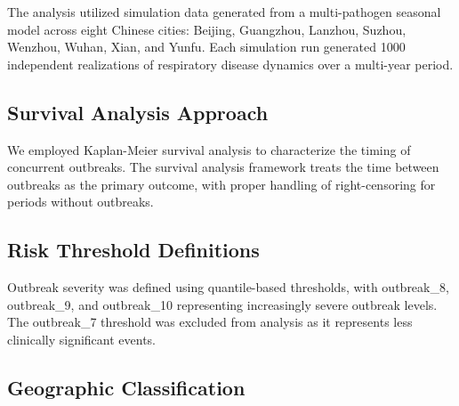 \documentclass[preprint,12pt]{elsarticle}
\begin{document}
The analysis utilized simulation data generated from a multi-pathogen seasonal model across eight Chinese cities: Beijing, Guangzhou, Lanzhou, Suzhou, Wenzhou, Wuhan, Xian, and Yunfu. Each simulation run generated 1000 independent realizations of respiratory disease dynamics over a multi-year period.


\subsection{Survival Analysis Approach}


We employed Kaplan-Meier survival analysis to characterize the timing of concurrent outbreaks. The survival analysis framework treats the time between outbreaks as the primary outcome, with proper handling of right-censoring for periods without outbreaks.


\subsection{Risk Threshold Definitions}


Outbreak severity was defined using quantile-based thresholds, with outbreak\_8, outbreak\_9, and outbreak\_10 representing increasingly severe outbreak levels. The outbreak\_7 threshold was excluded from analysis as it represents less clinically significant events.


\subsection{Geographic Classification}
\end{document}
